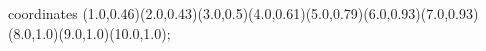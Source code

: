 					coordinates { (1.0,0.46)(2.0,0.43)(3.0,0.5)(4.0,0.61)(5.0,0.79)(6.0,0.93)(7.0,0.93)(8.0,1.0)(9.0,1.0)(10.0,1.0)};